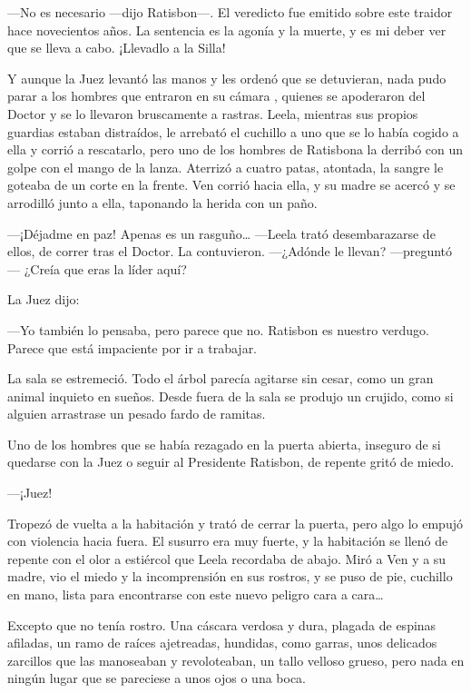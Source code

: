---No es necesario ---dijo Ratisbon---. El veredicto fue emitido sobre
este traidor hace novecientos años. La sentencia es la agonía y la
muerte, y es mi deber ver que se lleva a cabo. ¡Llevadlo a la Silla!

Y aunque la Juez levantó las manos y les ordenó que se detuvieran, nada
pudo parar a los hombres que entraron en su cámara , quienes se
apoderaron del Doctor y se lo llevaron bruscamente a rastras. Leela,
mientras sus propios guardias estaban distraídos, le arrebató el
cuchillo a uno que se lo había cogido a ella y corrió a rescatarlo, pero
uno de los hombres de Ratisbona la derribó con un golpe con el mango de
la lanza. Aterrizó a cuatro patas, atontada, la sangre le goteaba de un
corte en la frente. Ven corrió hacia ella, y su madre se acercó y se
arrodilló junto a ella, taponando la herida con un paño.

---¡Déjadme en paz! Apenas es un rasguño\ldots{} ---Leela trató
desembarazarse de ellos, de correr tras el Doctor. La contuvieron.
---¿Adónde le llevan? ---preguntó--- ¿Creía que eras la líder aquí?

La Juez dijo:

---Yo también lo pensaba, pero parece que no. Ratisbon es nuestro
verdugo. Parece que está impaciente por ir a trabajar.

La sala se estremeció. Todo el árbol parecía agitarse sin cesar, como un
gran animal inquieto en sueños. Desde fuera de la sala se produjo un
crujido, como si alguien arrastrase un pesado fardo de ramitas.

Uno de los hombres que se había rezagado en la puerta abierta, inseguro
de si quedarse con la Juez o seguir al Presidente Ratisbon, de repente
gritó de miedo.

---¡Juez!

Tropezó de vuelta a la habitación y trató de cerrar la puerta, pero algo
lo empujó con violencia hacia fuera. El susurro era muy fuerte, y la
habitación se llenó de repente con el olor a estiércol que Leela
recordaba de abajo. Miró a Ven y a su madre, vio el miedo y la
incomprensión en sus rostros, y se puso de pie, cuchillo en mano, lista
para encontrarse con este nuevo peligro cara a cara\ldots{}

Excepto que no tenía rostro. Una cáscara verdosa y dura, plagada de
espinas afiladas, un ramo de raíces ajetreadas, hundidas, como garras,
unos delicados zarcillos que las manoseaban y revoloteaban, un tallo
velloso grueso, pero nada en ningún lugar que se pareciese a unos ojos o
una boca.

